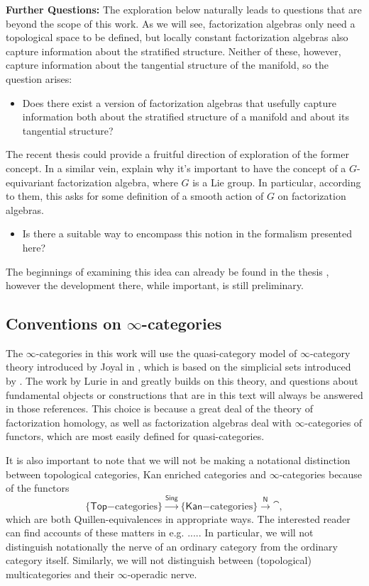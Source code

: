 \documentclass[../text]{subfiles}
\begin{document}
\textbf{Further Questions:} The exploration below naturally leads to questions that are beyond the scope of this work. As we will see, factorization algebras only need a topological space to be defined, but locally constant factorization algebras also capture information about the stratified structure. Neither of these, however, capture information about the tangential structure of the manifold, so the question arises:
%
\begin{itemize}
    \item Does there exist a version of factorization algebras that usefully capture information both about the stratified structure of a manifold and about its tangential structure?
\end{itemize}
%
The recent thesis \cite{pena2022} could provide a fruitful direction of exploration of the former concept. In a similar vein, \cite{cg2016} explain why it's important to have the concept of a $G$-equivariant factorization algebra, where $G$ is a Lie group. In particular, according to them, this asks for some definition of a smooth action of $G$ on factorization algebras.
%
\begin{itemize}
    \item Is there a suitable way to encompass this notion in the formalism presented here?
\end{itemize}
%
The beginnings of examining this idea can already be found in the thesis \cite{murray2020}, however the development there, while important, is still preliminary.



\subsection{Conventions on \texorpdfstring{$\infty$}{infinity}-categories}

The $\infty$-categories in this work will use the quasi-category model of $\infty$-category theory introduced by Joyal in \cite{joyal}, which is based on the simplicial sets introduced by \cite{bv73}. The work by Lurie in \cite{lurie_htt} and \cite{lurie_ha} greatly builds on this theory, and questions about fundamental objects or constructions that are in this text will always be answered in those references. This choice is because a great deal of the theory of factorization homology, as well as factorization algebras deal with $\infty$-categories of functors, which are most easily defined for quasi-categories.

It is also important to note that we will not be making a notational distinction between topological categories, Kan enriched categories and $\infty$-categories because of the functors
%
\begin{equation}
    \{ \mathsf{Top}\mathrm{-categories}\} \xrightarrow{\mathsf{Sing}} \{ \mathsf{Kan}\mathrm{-categories}\} \xrightarrow{\mathsf{N}} \cat,
\end{equation}
%
which are both Quillen-equivalences in appropriate ways. The interested reader can find accounts of these matters in e.g. ..... In particular, we will not distinguish notationally the nerve of an ordinary category from the ordinary category itself. Similarly, we will not distinguish between (topological) multicategories and their $\infty$-operadic nerve.
\end{document}
